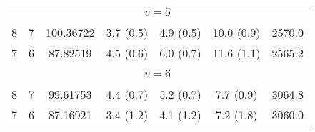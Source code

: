 \begin{table*}[htp]
\begin{tabular}{ccccccc}
\multicolumn{7}{c}{$v = 5$} \\
\vspace{-0.75em}\\
 8 & 7 & 100.36722 & 3.7 (0.5) & 4.9 (0.5) & 10.0 (0.9) & 2570.0 \\
 7 & 6 & 87.82519 & 4.5 (0.6) & 6.0 (0.7) & 11.6 (1.1) & 2565.2 \\
\hline
&\vspace{-0.75em}\\
\multicolumn{7}{c}{$v = 6$} \\
\vspace{-0.75em}\\
 8 & 7 & 99.61753 & 4.4 (0.7) & 5.2 (0.7) & 7.7 (0.9) & 3064.8 \\
 7 & 6 & 87.16921 & 3.4 (1.2) & 4.1 (1.2) & 7.2 (1.8) & 3060.0 \\
\end{tabular}

\par 
\end{table*}
